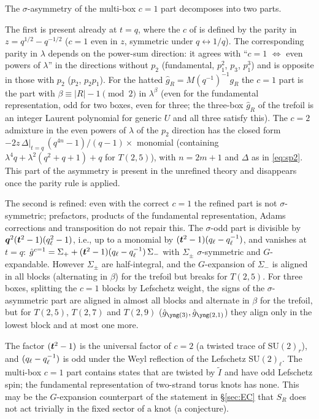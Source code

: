 \begin{result}\label{cr:multibox-sigma}
The $\sigma$-asymmetry of the multi-box $c = 1$ part decomposes into two parts.

The first is present already at $t = q$, where the $c$ of \cite{Marino09} is defined by the parity in $z = q^{1/2} - q^{-1/2}$ ($c = 1$ even in $z$, symmetric under $q \leftrightarrow 1/q$). The corresponding parity in $\lambda$ depends on the power-sum direction: it agrees with ``$c = 1$ $\Leftrightarrow$ even powers of $\lambda$'' in the directions without $p_2$ (fundamental, $p_1^2$, $p_3$, $p_1^3$) and is opposite in those with $p_2$ ($p_2$, $p_2 p_1$). For the hatted $\hat g_R = M(q^{-1})^{-1} g_R$ the $c = 1$ part is the part with $\beta \equiv |R| - 1 \pmod 2$ in $\lambda^\beta$ (even for the fundamental representation, odd for two boxes, even for three; the three-box $\hat g_R$ of the trefoil is an integer Laurent polynomial for generic $U$ and all three satisfy this). The $c = 2$ admixture in the even powers of $\lambda$ of the $p_2$ direction has the closed form $-2 z\,\Delta|_{t=q}\,(q^{4n}-1)/(q-1) \times$ monomial (containing $\lambda^4 q + \lambda^2(q^2+q+1) + q$ for $T(2,5)$), with $n = 2m+1$ and $\Delta$ as in \eqref{eq:sp2}. This part of the asymmetry is present in the unrefined theory and disappears once the parity rule is applied.

The second is refined: even with the correct $c = 1$ the refined part is not $\sigma$-symmetric; prefactors, products of the fundamental representation, Adams corrections and transposition do not repair this. The $\sigma$-odd part is divisible by $\bm{q}^2(\bm{t}^2 - 1)(q_\ell^2 - 1)$, i.e., up to a monomial by $(\bm{t}^2 - 1)(q_\ell - q_\ell^{-1})$, and vanishes at $t = q$: $\hat g^{c=1} = \Sigma_+ + (\bm{t}^2-1)(q_\ell - q_\ell^{-1})\,\Sigma_-$ with $\Sigma_\pm$ $\sigma$-symmetric and $G$-expandable. However $\Sigma_\pm$ are half-integral, and the $G$-expansion of $\Sigma_-$ is aligned in all blocks (alternating in $\beta$) for the trefoil but breaks for $T(2,5)$. For three boxes, splitting the $c = 1$ blocks by Lefschetz weight, the signs of the $\sigma$-asymmetric part are aligned in almost all blocks and alternate in $\beta$ for the trefoil, but for $T(2,5)$, $T(2,7)$ and $T(2,9)$ ($\hat g_{\ythree}, \hat g_{\ytwoone}$) they align only in the lowest block and at most one more.
\end{result}
The factor $(\bm{t}^2 - 1)$ is the universal factor of $c = 2$ (a twisted trace of $\mathrm{SU}(2)_r$), and $(q_\ell - q_\ell^{-1})$ is odd under the Weyl reflection of the Lefschetz $\mathrm{SU}(2)_\ell$. The multi-box $c = 1$ part contains states that are twisted by $\tilde I$ and have odd Lefschetz spin; the fundamental representation of two-strand torus knots has none. This may be the $G$-expansion counterpart of the statement in \S\ref{sec:EC} that $S_R$ does not act trivially in the fixed sector of a knot (a conjecture).

